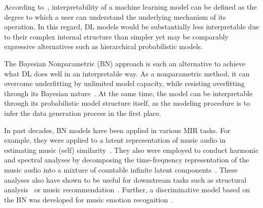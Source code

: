 \documentclass{article}
\begin{document}
According to~\cite{molnar2022, DBLP:journals/ai/Miller19}, interpretability of a machine learning model can be defined as the degree to which a user can understand the underlying mechanism of its operation. In this regard, DL models would be substantially less interpretable due to their complex internal structure than simpler yet may be comparably expressive alternatives such as hierarchical probabilistic models.

The Bayesian Nonparametric (BN) approach is such an alternative to achieve what DL does well in an interpretable way. As a nonparametric method, it can overcome underfitting by unlimited model capacity, while resisting overfitting through its Bayesian nature~\cite{DBLP:reference/ml/Teh17}. At the same time, the model can be interpretable through its probabilistic model structure itself, as the modeling procedure is to infer the data generation process in the first place.

In past decades, BN models have been applied in various MIR tasks. For example, they were applied to a latent representation of music audio in estimating music (self) similarity~\cite{DBLP:conf/icassp/QiPC07, DBLP:conf/ismir/HoffmanBC08}. They also were employed to conduct harmonic and spectral analyses by decomposing the time-frequency representation of the music audio into a mixture of countable infinite latent components~\cite{Hoffman09findinglatent, DBLP:conf/icassp/NakanoRKOS11}. These analyses also have shown to be useful for downstream tasks such as structural analysis~\cite{DBLP:conf/icassp/NakanoOKMK12} or music recommendation~\cite{DBLP:conf/ismir/YoshiiG09}. Further, a discriminative model based on the BN was developed for music emotion recognition~\cite{DBLP:journals/taffco/WangLCCH15}.
\end{document}
